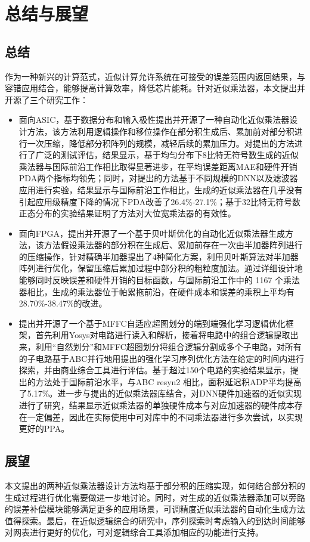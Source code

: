 \chapter{总结与展望}

\section{总结}

作为一种新兴的计算范式，近似计算允许系统在可接受的误差范围内返回结果，与容错应用结合，能够提高计算效率，降低芯片能耗。针对近似乘法器，本文提出并开源了三个研究工作：
\begin{itemize}
    \item 面向ASIC，基于数据分布和输入极性提出并开源了一种自动化近似乘法器设计方法，该方法利用逻辑操作和移位操作在部分积生成后、累加前对部分积进行一次压缩，降低部分积阵列的规模，减轻后续的累加压力。对提出的方法进行了广泛的测试评估，结果显示，基于均匀分布下8比特无符号数生成的近似乘法器与国际前沿工作相比取得显著进步，在平均误差距离MAE和硬件开销PDA两个指标均领先；同时，对提出的方法基于不同规模的DNN以及滤波器应用进行实验，结果显示与国际前沿工作相比，生成的近似乘法器在几乎没有引起应用级精度下降的情况下PDA改善了26.4\%-27.1\%；基于32比特无符号数正态分布的实验结果证明了方法对大位宽乘法器的有效性。
    \item 面向FPGA，提出并开源了一个基于贝叶斯优化的自动化近似乘法器生成方法，该方法假设乘法器的部分积在生成后、累加前存在一次由半加器阵列进行的压缩操作，针对精确半加器提出了4种简化方案，利用贝叶斯算法对半加器阵列进行优化，保留压缩后累加过程中部分积的粗粒度加法。通过详细设计地能够同时反映误差和硬件开销的目标函数，与国际前沿工作中的 1167 个乘法器相比，生成的乘法器位于帕累拖前沿，在硬件成本和误差的乘积上平均有28.70\%-38.47\%的改进。
    \item 提出并开源了一个基于MFFC自适应超图划分的端到端强化学习逻辑优化框架，首先利用Yosys对电路进行读入和解析，接着将电路中的组合逻辑提取出来，利用“自然划分”和MFFC超图划分将组合逻辑分割成多个子电路，对所有的子电路基于ABC并行地用提出的强化学习序列优化方法在给定的时间内进行探索，并由商业综合工具进行评估。基于超过150个电路的实验结果显示，提出的方法处于国际前沿水平，与ABC resyn2 相比，面积延迟积ADP平均提高了5.17\%。进一步与提出的近似乘法器库结合，对DNN硬件加速器的近似实现进行了研究，结果显示近似乘法器的单独硬件成本与对应加速器的硬件成本存在一定偏差，因此在实际使用中可对库中的不同乘法器进行多次尝试，以实现更好的PPA。
\end{itemize}

\section{展望}

本文提出的两种近似乘法器设计方法均基于部分积的压缩实现，如何结合部分积的生成过程进行优化需要做进一步地讨论。同时，对生成的近似乘法器添加可以旁路的误差补偿模块能够满足更多的应用场景，可调精度近似乘法器的自动化生成方法值得探索。最后，在近似逻辑综合的研究中，序列探索时考虑输入的到达时间能够对网表进行更好的优化，可对逻辑综合工具添加相应的功能进行支持。